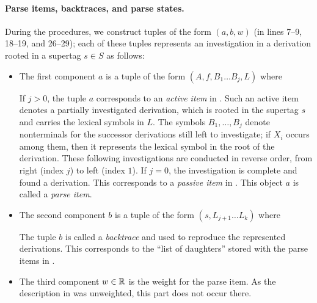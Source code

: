 \documentclass[../../document.tex]{subfiles}
\begin{document}
    \paragraph{Parse items, backtraces, and parse states.} During the procedures, we construct tuples of the form \((a, b, w)\) (in lines 7--9, 18--19, and 26--29); each of these tuples represents an investigation in a derivation rooted in a  supertag \(s \in S\) as follows:
    \begin{itemize}
        \item The first component \(a\) is a tuple of the form \((A, f, B_1 \ldots B_j, L)\) where
            If \(j>0\), the tuple \(a\) corresponds to an \emph{active item} in .
            Such an active item denotes a partially investigated derivation, which is rooted in the supertag \(s\) and carries the lexical symbols in \(L\).
            The symbols \(B_1, \ldots, B_j\) denote nonterminals for the successor derivations still left to investigate; if \(X_i\) occurs among them, then it represents the lexical symbol in the root of the derivation.
            These following investigations are conducted in reverse order, from right (index $j$) to left (index $1$).
            If \(j=0\), the investigation is complete and found a derivation. This corresponds to a \emph{passive item} in .
            This object \(a\) is called a \emph{parse item}.
        \item The second component \(b\) is a tuple of the form \((s, L_{j+1} \ldots L_k)\) where
            The tuple \(b\) is called a \emph{backtrace} and used to reproduce the represented derivations.
            This corresponds to the ``list of daughters'' stored with the parse items in .
        \item
            The third component \(w \in \mathbb{R}\) is the weight for the parse item.
            As the description in  was unweighted, this part does not occur there.
    \end{itemize}
\end{document}
